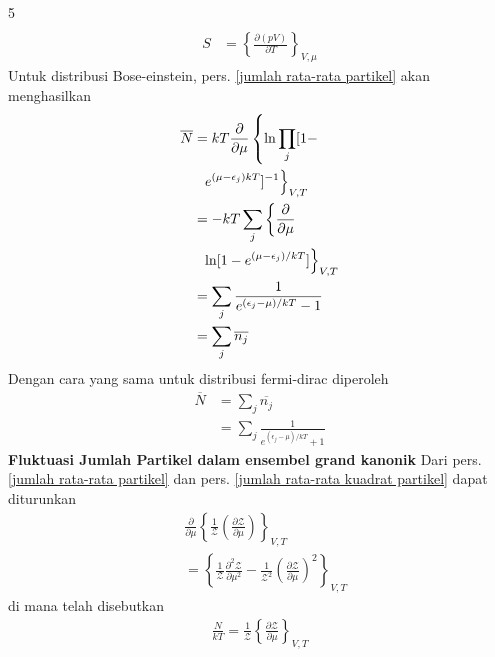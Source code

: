 \documentclass[a4paper  , 6 pt]{article}
\begin{document}
\begin{tiny}
\begin{multicols} {5}
\begin{align}
\end{align}
\begin{align}
S& = \left \lbrace  \frac{\partial (pV)}{\partial T}\right \rbrace_{V, \mu}
\end{align}
Untuk distribusi Bose-einstein, pers. \ref{jumlah rata-rata partikel} akan menghasilkan
\begin{align}
\overline{N} &= kT \frac{\partial}{\partial \mu } \left \lbrace \ln \prod_j [1 - \right. \nonumber \\ 
& \hspace{0.2 cm } \left. e^{(\mu - \epsilon_j)kT}]^{-1} \right \rbrace_{V,T} \nonumber \\
& = - kT \sum_j \left \lbrace \frac{\partial}{\partial \mu} \right. \nonumber \\
& \hspace{0.2 cm} \left. \ln[1 - e^{(\mu - \epsilon_j )/kT}] \right \rbrace_{V,T} \nonumber \\
& = \sum_j \frac{1}{e^{(\epsilon_j - \mu )/kT} - 1} \nonumber \\
& = \sum_j \overline{n_j }
\end{align}
Dengan cara yang sama untuk distribusi fermi-dirac diperoleh
\begin{align}
\overline{N} &  = \sum_j \overline{n_j } \nonumber \\
& = \sum_j \frac{1}{e^{(\epsilon_j - \mu )/kT} + 1}
\end{align}
\newline
\textbf{Fluktuasi Jumlah Partikel dalam ensembel grand kanonik} \newline
Dari pers. \ref{jumlah rata-rata partikel} dan pers. \ref{jumlah rata-rata kuadrat partikel} dapat diturunkan
\begin{align}
& \frac{\partial}{\partial \mu } \left \lbrace  \frac{1}{\boldsymbol{ \mathcal{Z}}} \left( \frac{\partial \boldsymbol{\mathcal{Z}}}{\partial \mu }\right)\right  \rbrace_{V,T}\nonumber \\ &  = \left\lbrace  \frac{1}{\boldsymbol{\mathcal{Z}}} \frac{\partial^2 \boldsymbol{\mathcal{Z}}}{\partial \mu^2}  - \frac{1}{\boldsymbol{\mathcal{Z}}^2} \left(\frac{\partial \boldsymbol{\mathcal{Z}}}{\partial \mu }\right)^2\right \rbrace_{V,T}
\end{align}
di mana telah disebutkan
\begin{align}
\frac{N}{kT} = \frac{1}{\boldsymbol{\mathcal{Z}}} \left \lbrace \frac{\partial \boldsymbol{\mathcal{Z}}}{\partial \mu } \right \rbrace_{V,T}
\end{align}

\end{multicols}
\end{tiny}
\end{document}

